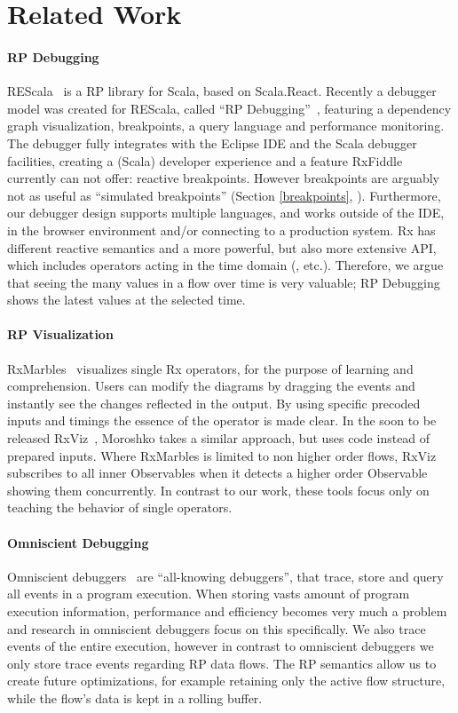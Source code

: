 \section{Related Work}

\paragraph{RP Debugging} 
REScala~\cite{salvaneschi2014rescala} is a RP library for Scala, based on Scala.React. 
Recently a debugger model was created for REScala, called ``RP Debugging''~\cite{salvaneschi2016debugging}, 
featuring a dependency graph visualization, breakpoints, a query language and performance monitoring.
The debugger fully integrates with the Eclipse IDE and the Scala debugger facilities, 
creating a (Scala) developer experience and a feature RxFiddle currently can not offer: reactive breakpoints. 
However breakpoints are arguably not as useful as ``simulated breakpoints'' (Section \ref{breakpoints}, ).
Furthermore, our debugger design supports multiple languages, and works outside of the IDE,
in the browser environment and/or connecting to a production system.
Rx has different reactive semantics and a more powerful, but also more extensive API, which includes operators acting in the time domain (, etc.).
Therefore, we argue that seeing the many values in a flow over time is very valuable; 
RP Debugging shows the latest values at the selected time.

\paragraph{RP Visualization} 
RxMarbles~\cite{rxmarbles} visualizes single Rx operators, for the purpose of learning and comprehension.
Users can modify the diagrams by dragging the events and instantly see the changes reflected in the output.
By using specific precoded inputs and timings the essence of the operator is made clear.
In the soon to be released RxViz~\cite{rxviz}, 
Moroshko takes a similar approach, but uses code instead of prepared inputs.
Where RxMarbles is limited to non higher order flows, RxViz subscribes to all inner Observables when it detects a higher order Observable showing them concurrently.
In contrast to our work, these tools focus only on teaching the behavior of single operators.

\paragraph{Omniscient Debugging} Omniscient debuggers~\cite{pothier2009back} are ``all-knowing debuggers'', 
that trace, store and query all events in a program execution.
When storing vasts amount of program execution information, performance and efficiency becomes very much a problem and research in omniscient debuggers focus on this specifically.
We also trace events of the entire execution, however in contrast to omniscient debuggers we only store trace events regarding RP data flows.
The RP semantics allow us to create future optimizations, for example retaining only the active flow structure, while the flow's data is kept in a rolling buffer.

